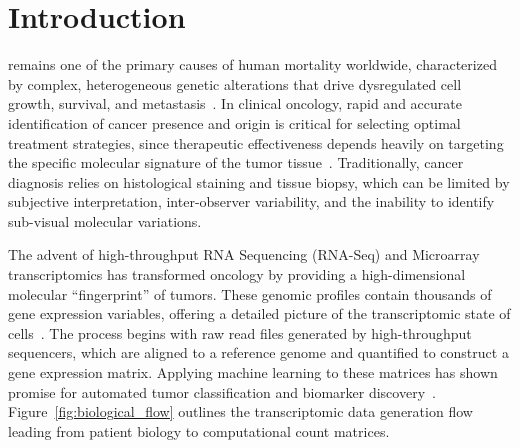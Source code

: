 \documentclass[journal,10pt]{IEEEtran}
\begin{document}
\IEEEpeerreviewmaketitle

\section{Introduction}
 remains one of the primary causes of human mortality worldwide, characterized by complex, heterogeneous genetic alterations that drive dysregulated cell growth, survival, and metastasis~\cite{hallmarks}. In clinical oncology, rapid and accurate identification of cancer presence and origin is critical for selecting optimal treatment strategies, since therapeutic effectiveness depends heavily on targeting the specific molecular signature of the tumor tissue~\cite{tcga, hoadley}. Traditionally, cancer diagnosis relies on histological staining and tissue biopsy, which can be limited by subjective interpretation, inter-observer variability, and the inability to identify sub-visual molecular variations.

The advent of high-throughput RNA Sequencing (RNA-Seq) and Microarray transcriptomics has transformed oncology by providing a high-dimensional molecular ``fingerprint'' of tumors. These genomic profiles contain thousands of gene expression variables, offering a detailed picture of the transcriptomic state of cells~\cite{libbrecht}. The process begins with raw read files generated by high-throughput sequencers, which are aligned to a reference genome and quantified to construct a gene expression matrix. Applying machine learning to these matrices has shown promise for automated tumor classification and biomarker discovery~\cite{eraslan}. Figure~\ref{fig:biological_flow} outlines the transcriptomic data generation flow leading from patient biology to computational count matrices.
\end{document}

